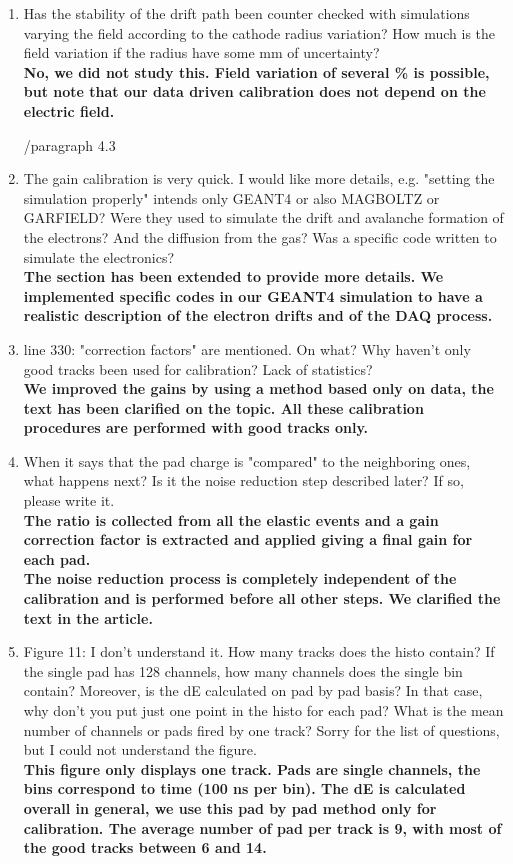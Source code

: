 \documentclass[a4paper,11pt,twoside]{article}
\begin{document}
\begin{enumerate}
\item Has the stability of the drift path been counter checked with simulations 
   varying the field according to the cathode radius variation? How much is the 
   field variation if the radius have some mm of uncertainty?\\
{ \bf No, we did not study this. Field variation of several \% is
   possible, but note that our data driven calibration does not depend on
   the electric field.} 

        /paragraph 4.3
\item The gain calibration is very quick. I would like more details, e.g. 
   "setting the simulation properly" intends only GEANT4 or also MAGBOLTZ or 
   GARFIELD? Were they used to simulate the drift and avalanche formation of 
   the electrons? And the diffusion from the gas? Was a specific code written 
   to simulate the electronics?\\
{ \bf The section has been extended to provide more details. We 
implemented specific codes in our GEANT4 simulation to have a realistic 
description of the electron drifts and of the DAQ process.} 

\item line 330: "correction factors" are mentioned. On what? Why haven't only 
   good tracks been used for calibration? Lack of statistics?\\
{ \bf We improved the gains by using a method based only on data,
the text has been clarified on the topic. All these calibration procedures
are performed with good tracks only.} 

\item When it says that the pad charge is "compared" to the neighboring ones, 
   what happens next? Is it the noise reduction step described later? If so, 
   please write it. \\
{ \bf  
 The ratio is collected from all the elastic events and a gain correction 
 factor is extracted and applied giving a final gain for each pad. \\
 The noise reduction process is completely independent of the calibration
 and is performed before all other steps. We clarified the text in the article. 
  } 

\item Figure 11: I don't understand it. How many tracks does the histo contain? 
   If the single pad has 128 channels, how many channels does the single bin 
   contain? Moreover, is the dE calculated on pad by pad basis? In that case, 
   why don't you put just one point in the histo for each pad? What is the mean 
   number of channels or pads fired by one track? Sorry for the list of 
   questions, but I could not understand the figure.\\
   { \bf This figure only displays one track. Pads are single channels, 
the bins correspond to time (100 ns per bin). The dE is calculated overall in general,
we use this pad by pad method only for calibration. The average number of pad per 
track is 9, with most of the good tracks between 6 and 14.}


\end{enumerate}
\end{document}
